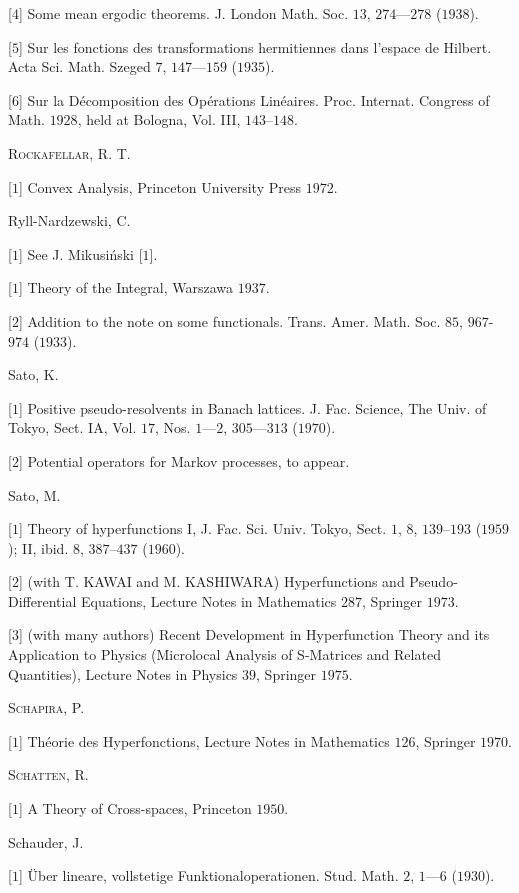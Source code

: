 [$4$] Some mean ergodic theorems. J. London Math. Soc. $13$, $274$---$278$ ($1938$). 

[$5$] Sur les fonctions des transformations hermitiennes dans l'espace de Hilbert. Acta Sci. Math. Szeged $7$, $147$---$159$ ($1935$). 

[$6$] Sur la Décomposition des Opérations Linéaires. Proc. Internat. Congress of Math. $1928$, held at Bologna, Vol. III, $143$--$148$. 

\textsc{Rockafellar}, R. T. 

[$1$] Convex Analysis, Princeton University Press $1972$. 

Ryll-Nardzewski, C. 

[$1$] See J. Mikusiński [$1$]. 


[$1$] Theory of the Integral, Warszawa $1937$. 

[$2$] Addition to the note on some functionals. Trans. Amer. Math. Soc. $85$, $967$-$974$ ($1933$). 

Sato, K. 

[$1$] Positive pseudo-resolvents in Banach lattices. J. Fac. Science, The Univ. of Tokyo, Sect. IA, Vol. $17$, Nos. $1$---$2$, $305$---$313$ ($1970$). 

[$2$] Potential operators for Markov processes, to appear. 

Sato, M. 

[$1$] Theory of hyperfunctions I, J. Fac. Sci. Univ. Tokyo, Sect. $1$, $8$, $139$--$193$ ($1959$); II, ibid. $8$, $387$--$437$ ($1960$). 

[$2$] (with T. KAWAI and M. KASHIWARA) Hyperfunctions and Pseudo-Differential Equations, Lecture Notes in Mathematics $287$, Springer $1973$. 

[$3$] (with many authors) Recent Development in Hyperfunction Theory and its Application to Physics (Microlocal Analysis of S-Matrices and Related Quantities), Lecture Notes in Physics $39$, Springer $1975$. 

\textsc{Schapira}, P. 

[$1$] Théorie des Hyperfonctions, Lecture Notes in Mathematics $126$, Springer $1970$. 

\textsc{Schatten}, R. 

[$1$] A Theory of Cross-spaces, Princeton $1950$. 

Schauder, J. 

[$1$] Über lineare, vollstetige Funktionaloperationen. Stud. Math. $2$, $1$---$6$ ($1930$). 

